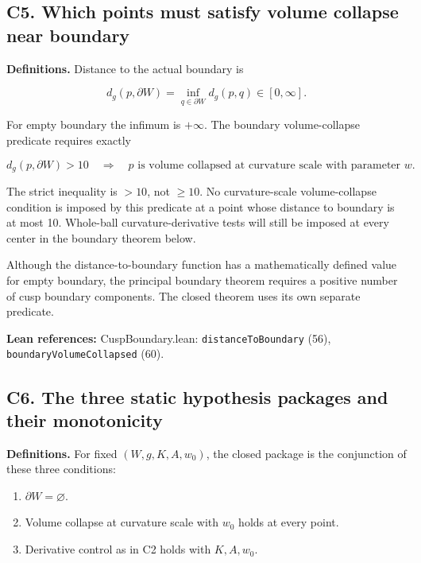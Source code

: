 \documentclass[
  letterpaper,
  11pt]{article}
\providecommand{\tightlist}{%
  \setlength{\itemsep}{0pt}\setlength{\parskip}{0pt}}
\begin{document}
\subsection{C5. Which points must satisfy volume collapse near
boundary}\label{collapse-boundarydistance}

\textbf{Definitions.} Distance to the actual boundary is

\[
 d_g(p,\partial W)=\inf_{q\in\partial W}d_g(p,q)\in[0,\infty].
\]

For empty boundary the infimum is \(+\infty\). The boundary
volume-collapse predicate requires exactly

\[
 d_g(p,\partial W)>10\quad\Longrightarrow\quad
 p\text{ is volume collapsed at curvature scale with parameter }w.
\]

The strict inequality is \(>10\), not \(\geq10\). No curvature-scale
volume-collapse condition is imposed by this predicate at a point whose
distance to boundary is at most 10. Whole-ball curvature-derivative
tests will still be imposed at every center in the boundary theorem
below.

Although the distance-to-boundary function has a mathematically defined
value for empty boundary, the principal boundary theorem requires a
positive number of cusp boundary components. The closed theorem uses its
own separate predicate.

\textbf{Lean references:} CuspBoundary.lean:
{\small\texttt{distance\allowbreak{}To\allowbreak{}Boundary}} (56),
{\small\texttt{boundary\allowbreak{}Volume\allowbreak{}Collapsed}} (60).

\subsection{C6. The three static hypothesis packages and their
monotonicity}\label{collapse-hypotheses}

\textbf{Definitions.} For fixed \((W,g,K,A,w_0)\), the closed package is
the conjunction of these three conditions:

\begin{enumerate}
\def\labelenumi{\arabic{enumi}.}
\tightlist
\item
  \(\partial W=\varnothing\).
\item
  Volume collapse at curvature scale with \(w_0\) holds at every point.
\item
  Derivative control as in C2 holds with \(K,A,w_0\).
\end{enumerate}
\end{document}
